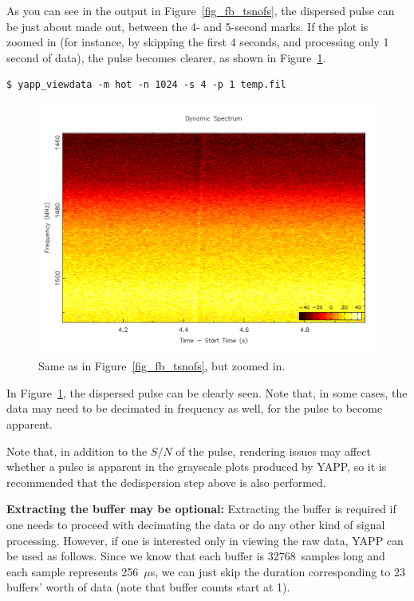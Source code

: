 \documentclass{article}
\begin{document}
As you can see in the output in Figure~\ref{fig_fb_tsnofs}, the dispersed pulse
can be just about made out, between the 4- and 5-second marks. If the plot is
zoomed in (for instance, by skipping the first 4 seconds, and processing only 1
second of data), the pulse becomes clearer, as shown in
Figure~\ref{fig_fb_tsnofs_zoomed}.

\small{
\begin{verbatim}
$ yapp_viewdata -m hot -n 1024 -s 4 -p 1 temp.fil
\end{verbatim}
}

\begin{figure}[h]
\includegraphics[width=\textwidth]{fb_tsnofs_zoomed.png}
\caption{Same as in Figure~\ref{fig_fb_tsnofs}, but zoomed in.
    \label{fig_fb_tsnofs_zoomed}}
\end{figure}

In Figure~\ref{fig_fb_tsnofs_zoomed}, the dispersed pulse can be clearly seen.
Note that, in some cases, the data may need to be decimated in frequency as
well, for the pulse to become apparent.

Note that, in addition to the $S/N$ of the pulse, rendering issues may affect
whether a pulse is apparent in the grayscale plots produced by YAPP, so it is
recommended that the dedispersion step above is also performed.

\textbf{Extracting the buffer may be optional:} Extracting the buffer is
required if one needs to proceed with decimating the data or do any other kind
of signal processing. However, if one is interested only in viewing the raw
data, YAPP can be used as follows. Since we know that each buffer is
32768~samples long and each sample represents 256~$\mu$s, we can just skip the
duration corresponding to 23 buffers' worth of data (note that buffer counts
start at 1).
\end{document}
